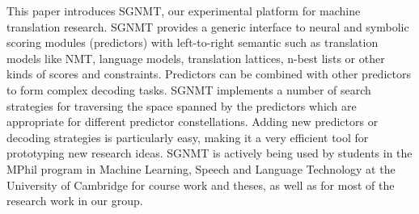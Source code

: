 This paper introduces SGNMT, our experimental platform for machine translation research. SGNMT provides a generic interface to neural and symbolic scoring modules (predictors) with left-to-right semantic such as translation models like NMT, language models, translation lattices, n-best lists or other kinds of scores and constraints. Predictors can be combined with other predictors to form complex decoding tasks. SGNMT implements a number of search strategies for traversing the space spanned by the predictors which are appropriate for different predictor constellations. Adding new predictors or decoding strategies is particularly easy, making it a very efficient tool for prototyping new research ideas. SGNMT is actively being used by students in the MPhil program in Machine Learning, Speech and Language Technology at the University of Cambridge for course work and theses, as well as for most of the research work in our group.
